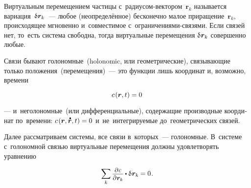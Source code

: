 \begin{otherlanguage}{russian}

Виртуальным перемещением частицы с~радиусом\hbox{-}вектором~${\bm{r}_k}$ называется вариация~${\variation{\hspace{.1ex}\bm{r}_k}}$~--- %
любое (неопределённое) бесконечно малое приращение~${\bm{r}_k}$, происходящее мгновенно %
и~совместимое с~ограничениями\hbox{-}связями. %
Если связей нет, то~есть система свободна, тогда виртуальные перемещения ${\variation{\hspace{.1ex}\bm{r}_k}}$ совершенно любые.

Связи бывают голономные~(holonomic, или геометрические), связывающие только положения~(перемещения)~--- это функции лишь координат и, возможно, времени

\nopagebreak\vspace{-0.1em}\begin{equation}\label{holonomicconstraint}
c\hspace{.2ex}(\bm{r}, t) = 0
\end{equation}

\vspace{-0.12em} \noindent --- и~неголономные~(или дифференциальные), содержащие производные координат по~времени: ${c\hspace{.2ex}(\bm{r}, \mathdotabove{\bm{r}}, t) = 0}$ и~не~интегрируемые до~геометрических связей.

Далее рассматриваем системы, все связи в~которых~--- голономные. В~системе с~голономной связью виртуальные перемещения должны удовлетворять уравнению

\nopagebreak\vspace{-0.1em}\begin{equation}\label{requirementforvirtualdisplacements}
\displaystyle \sum_k \scalebox{0.92}{$\displaystyle \frac{\raisemath{-0.12em}{\partial \hspace{.1ex} c}}{\partial \hspace{.1ex} \bm{r}_k}$} \hspace{-0.1ex} \dotp \variation{\hspace{.1ex}\bm{r}_k} \hspace{-0.1ex} = 0 \hspace{.16ex}.
\vspace{-0.25em}\end{equation}


\end{otherlanguage}
